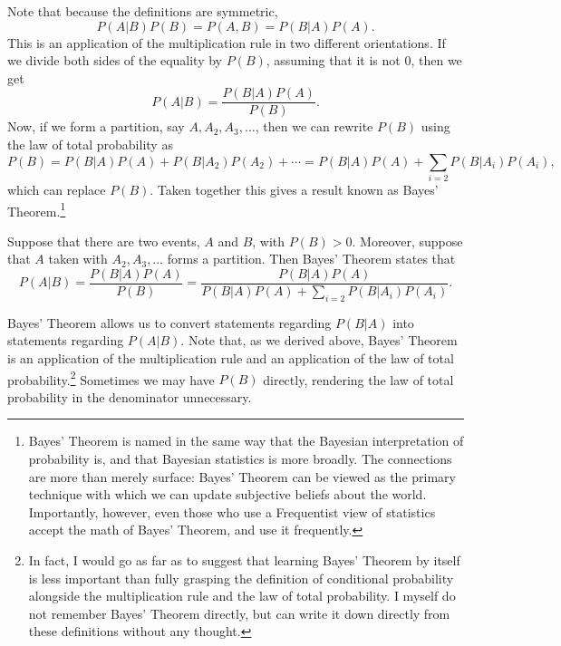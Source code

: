 \documentclass[
  letterpaper,
  DIV=11,
  numbers=noendperiod]{scrreprt}
\theoremstyle{definition}
\theoremstyle{definition}
\theoremstyle{definition}
\theoremstyle{remark}
\begin{document}
Note that because the definitions are symmetric,
\[P(A|B)P(B) = P(A,B) = P(B|A)P(A).\] This is an application of the
multiplication rule in two different orientations. If we divide both
sides of the equality by \(P(B)\), assuming that it is not \(0\), then
we get \[P(A|B) = \frac{P(B|A)P(A)}{P(B)}.\] Now, if we form a
partition, say \(A,A_2,A_3,\dots\), then we can rewrite \(P(B)\) using
the law of total probability as
\[P(B) = P(B|A)P(A) + P(B|A_2)P(A_2) + \cdots = P(B|A)P(A) + \sum_{i=2}P(B|A_i)P(A_i),\]
which can replace \(P(B)\). Taken together this gives a result known as
Bayes' Theorem.\footnote{Bayes' Theorem is named in the same way that
  the Bayesian interpretation of probability is, and that Bayesian
  statistics is more broadly. The connections are more than merely
  surface: Bayes' Theorem can be viewed as the primary technique with
  which we can update subjective beliefs about the world. Importantly,
  however, even those who use a Frequentist view of statistics accept
  the math of Bayes' Theorem, and use it frequently.}

\begin{tcolorbox}[enhanced jigsaw, rightrule=.15mm, leftrule=.75mm, opacitybacktitle=0.6, title={Bayes' Theorem}, colframe=quarto-callout-tip-color-frame, opacityback=0, coltitle=black, breakable, toptitle=1mm, colbacktitle=quarto-callout-tip-color!10!white, bottomtitle=1mm, titlerule=0mm, arc=.35mm, colback=white, toprule=.15mm, left=2mm, bottomrule=.15mm]

Suppose that there are two events, \(A\) and \(B\), with \(P(B) > 0\).
Moreover, suppose that \(A\) taken with \(A_2, A_3, \dots\) forms a
partition. Then Bayes' Theorem states that
\[P(A|B) = \frac{P(B|A)P(A)}{P(B)} = \frac{P(B|A)P(A)}{P(B|A)P(A) + \sum_{i=2} P(B|A_i)P(A_i)}.\]

\end{tcolorbox}

Bayes' Theorem allows us to convert statements regarding \(P(B|A)\) into
statements regarding \(P(A|B)\). Note that, as we derived above, Bayes'
Theorem is an application of the multiplication rule and an application
of the law of total probability.\footnote{In fact, I would go as far as
  to suggest that learning Bayes' Theorem by itself is less important
  than fully grasping the definition of conditional probability
  alongside the multiplication rule and the law of total probability. I
  myself do not remember Bayes' Theorem directly, but can write it down
  directly from these definitions without any thought.} Sometimes we may
have \(P(B)\) directly, rendering the law of total probability in the
denominator unnecessary.
\end{document}
